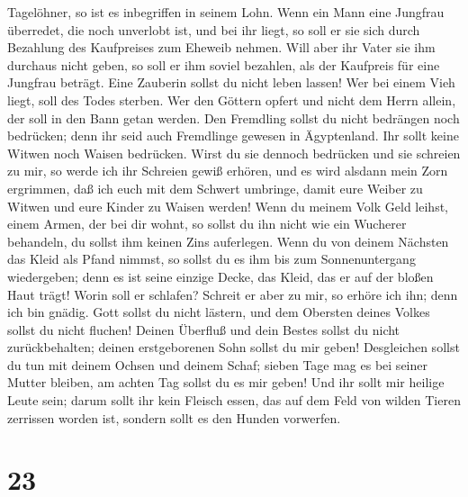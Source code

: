 Tagelöhner, so ist es inbegriffen in seinem Lohn.  Wenn
ein Mann eine Jungfrau überredet, die noch unverlobt ist, und bei ihr
liegt, so soll er sie sich durch Bezahlung des Kaufpreises zum Eheweib
nehmen.  Will aber ihr Vater sie ihm durchaus nicht
geben, so soll er ihm soviel bezahlen, als der Kaufpreis für eine
Jungfrau beträgt.  Eine Zauberin sollst du nicht leben
lassen!  Wer bei einem Vieh liegt, soll des Todes
sterben.  Wer den Göttern opfert und nicht dem Herrn
allein, der soll in den Bann getan werden.  Den Fremdling
sollst du nicht bedrängen noch bedrücken; denn ihr seid auch Fremdlinge
gewesen in Ägyptenland.  Ihr sollt keine Witwen noch
Waisen bedrücken.  Wirst du sie dennoch bedrücken und sie
schreien zu mir, so werde ich ihr Schreien gewiß erhören,
 und es wird alsdann mein Zorn ergrimmen, daß ich euch
mit dem Schwert umbringe, damit eure Weiber zu Witwen und eure Kinder zu
Waisen werden!  Wenn du meinem Volk Geld leihst, einem
Armen, der bei dir wohnt, so sollst du ihn nicht wie ein Wucherer
behandeln, du sollst ihm keinen Zins auferlegen.  Wenn du
von deinem Nächsten das Kleid als Pfand nimmst, so sollst du es ihm bis
zum Sonnenuntergang wiedergeben;  denn es ist seine
einzige Decke, das Kleid, das er auf der bloßen Haut trägt! Worin soll
er schlafen? Schreit er aber zu mir, so erhöre ich ihn; denn ich bin
gnädig.  Gott sollst du nicht lästern, und dem Obersten
deines Volkes sollst du nicht fluchen!  Deinen Überfluß
und dein Bestes sollst du nicht zurückbehalten; deinen erstgeborenen
Sohn sollst du mir geben!  Desgleichen sollst du tun mit
deinem Ochsen und deinem Schaf; sieben Tage mag es bei seiner Mutter
bleiben, am achten Tag sollst du es mir geben!  Und ihr
sollt mir heilige Leute sein; darum sollt ihr kein Fleisch essen, das
auf dem Feld von wilden Tieren zerrissen worden ist, sondern sollt es
den Hunden vorwerfen.

\hypertarget{section-22}{%
\section{23}\label{section-22}}

